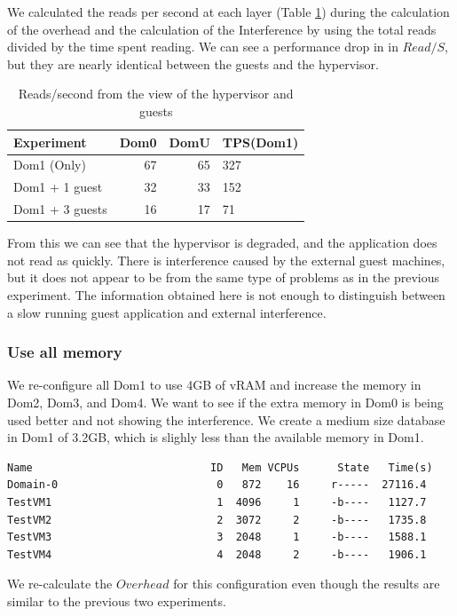 We calculated the reads per second at each layer (Table \ref{fig:rps}) during the calculation of the overhead and the calculation of the Interference by using the total reads divided by the time spent reading.    We can see a performance drop in in $Read/S$, but they are nearly identical between the guests and the hypervisor.  
\begin{table}[!h]
\begin{tabular}{ l r r p{5cm} }
	Experiment     & Dom0 & DomU  & TPS(Dom1) \\
	\hline
    Dom1 (Only)    & 67 & 65 & 327 \\
    Dom1 + 1 guest & 32 & 33 & 152 \\
    Dom1 + 3 guests& 16 & 17 &  71 \\
\end{tabular}
\caption{Reads/second from the view of the hypervisor and guests}
\label{fig:rps}
\end{table}

From this we can see that the hypervisor is degraded, and the application does not read as quickly.  There is interference caused by the external guest machines, but it does not appear to be from the same type of problems as in the previous experiment. The information obtained here is not enough to distinguish between a slow running guest application and external interference.

\subsubsection{Use all memory}
We re-configure all Dom1 to use 4GB of vRAM and increase the memory in Dom2, Dom3, and Dom4. We want to see if the extra memory in Dom0 is being used better and not showing the interference.
We create a medium size database in Dom1 of 3.2GB, which is slighly less than the available memory in Dom1. 

\begin{Verbatim}
Name                            ID   Mem VCPUs      State   Time(s)
Domain-0                         0   872    16     r-----  27116.4
TestVM1                          1  4096     1     -b----   1127.7
TestVM2                          2  3072     2     -b----   1735.8
TestVM3                          3  2048     1     -b----   1588.1
TestVM4                          4  2048     2     -b----   1906.1
\end{Verbatim}

We re-calculate the $Overhead$ for this configuration even though the results are similar to the previous two experiments.

